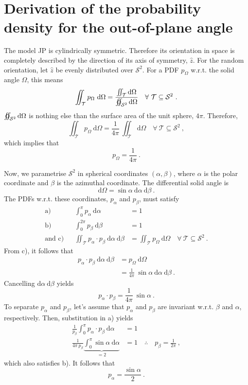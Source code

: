 \documentclass[10pt]{article}
\begin{document}
\section*{Derivation of the probability density for the out-of-plane angle}

The model JP is cylindrically symmetric. Therefore its orientation in space is completely described by the direction of its axis of symmetry, $\hat{z}$. 
For the random orientation, let $\hat{z}$ be evenly distributed over $\mathcal{S}^2$. 
For a PDF $p_\Omega$ w.r.t. the solid angle $\Omega$, this means
$$
\iint_{\mathcal{T}} p_\Omega \ \mathrm{d}\Omega
=
\frac{
\iint_{\mathcal{T}} \mathrm{d}\Omega
}{
\varoiint_{\mathcal{S}^2} \mathrm{d}\Omega
}
\quad\forall\ \mathcal{T}\subseteq\mathcal{S}^2
\ .
$$
$\varoiint_{\mathcal{S}^2} \mathrm{d}\Omega$ is nothing else than the surface area of the unit sphere, $4\pi$. 
Therefore, 
$$
\iint_{\mathcal{T}} p_\Omega \ \mathrm{d}\Omega
=
\frac{1}{4\pi}\ 
\iint_{\mathcal{T}} \mathrm{d}\Omega
\quad\forall\ \mathcal{T}\subseteq\mathcal{S}^2
\ ,
$$
which implies that
$$
p_\Omega=\frac{1}{4\pi}\ .
$$

Now, we parametrise $\mathcal{S}^2$ in spherical coordinates $(\alpha,\beta)$, where $\alpha$ is the polar coordinate and $\beta$ is the azimuthal coordinate. 
The differential solid angle is
$$
\mathrm{d}\Omega = \sin\alpha \ \mathrm{d}\alpha \ \mathrm{d}\beta \ .
$$
The PDFs w.r.t. these coordinates, $p_{\alpha}$ and $p_\beta$, must satisfy
$$
\begin{aligned}
\text{a)}&&
\int_0^\pi p_{\alpha} \ \mathrm{d}\alpha &= 1
\\
\text{b)}&&
\int_0^{2\pi} p_{\beta} \ \mathrm{d}\beta &= 1
\\
\text{and c)}&&
\iint_{\mathcal{T}} p_\alpha \cdot p_\beta \ \mathrm{d}\alpha\ \mathrm{d}\beta
&=
\iint_{\mathcal{T}} p_\Omega \ \mathrm{d}\Omega
\quad\forall\ \mathcal{T}\subseteq\mathcal{S}^2
\ .
\end{aligned}
$$
From \mbox{c)}, it follows that
$$
\begin{aligned}
p_\alpha \cdot p_\beta \ \mathrm{d}\alpha\ \mathrm{d}\beta &= p_\Omega \ \mathrm{d}\Omega
\\
&= \frac{1}{4\pi} \ \sin\alpha \ \mathrm{d}\alpha \ \mathrm{d}\beta \ .
\end{aligned}
$$
Cancelling $\mathrm{d}\alpha\ \mathrm{d}\beta$ yields
$$
p_\alpha \cdot p_\beta = \frac{1}{4\pi} \ \sin\alpha \ .
$$
To separate $p_\alpha$ and $p_\beta$, let's assume that $p_\alpha$ and $p_\beta$ are invariant w.r.t. $\beta$ and $\alpha$, respectively. 
Then, substitution in \mbox{a)} yields
$$
\begin{aligned}
\frac{1}{p_\beta} \int_0^\pi p_\alpha \cdot p_\beta \ \mathrm{d}\alpha &= 1
\\
\frac{1}{4\pi\ p_\beta} \underbrace{\int_0^\pi \sin\alpha \ \mathrm{d}\alpha}_{=2} &= 1
\quad\therefore\quad
p_\beta = \frac{1}{2\pi}
\ ,
\end{aligned}
$$
which also satisfies \mbox{b)}. 
It follows that 
$$p_\alpha = \frac{\sin\alpha}{2} \ .$$
\end{document}
